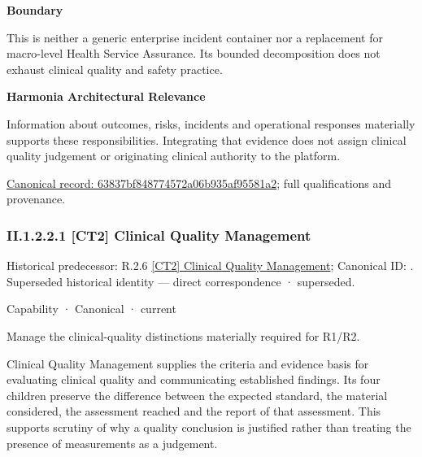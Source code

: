 \textbf{Boundary}



This is neither a generic enterprise incident container nor a replacement for macro-level Health Service Assurance. Its bounded decomposition does not exhaust clinical quality and safety practice.



\textbf{Harmonia Architectural Relevance}



Information about outcomes, risks, incidents and operational responses materially supports these responsibilities. Integrating that evidence does not assign clinical quality judgement or originating clinical authority to the platform.


{\footnotesize \href{../../../../continuum/strategy/capability/63837bf848774572a06b935af95581a2.md}{Canonical record: 63837bf848774572a06b935af95581a2}; full qualifications and provenance.}\par
\subsubsection*{II.1.2.2.1 [CT2] Clinical Quality Management}
\label{navigation:II.1.2.2.1}

{\small Historical predecessor: R.2.6 \hyperref[element:dc1bece79eb7452e951d03a2ee6dfaa6]{[CT2] Clinical Quality Management}; Canonical ID: \texttt{}. Superseded historical identity — direct correspondence · superseded.}\par
\label{element:89761f2d38f846c39df1df0975964288}
{\small Capability · Canonical · current}\par

Manage the clinical-quality distinctions materially required for R1/R2.



Clinical Quality Management supplies the criteria and evidence basis for evaluating clinical quality and communicating established findings. Its four children preserve the difference between the expected standard, the material considered, the assessment reached and the report of that assessment. This supports scrutiny of why a quality conclusion is justified rather than treating the presence of measurements as a judgement.



